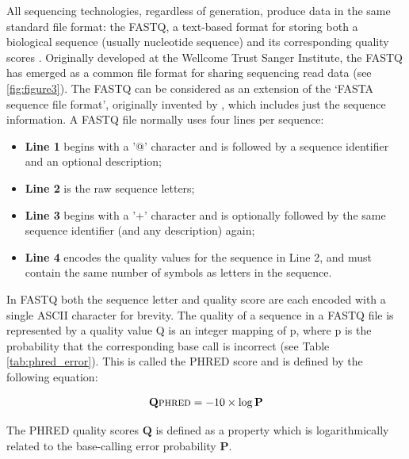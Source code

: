 All sequencing technologies, regardless of generation, produce data in the same standard file format: the FASTQ, a text-based format for storing both a biological sequence (usually nucleotide sequence) and its corresponding quality scores \citep{cock_sanger_2010}. Originally developed at the Wellcome Trust Sanger Institute, the FASTQ has emerged as a common file format for sharing sequencing read data (see \ref{fig:figure3}). The FASTQ can be considered as an extension of the ‘FASTA sequence file format’, originally invented by \cite{pearson_improved_1988}, which includes just the sequence information. A FASTQ file normally uses four lines per sequence:

\begin{itemize}
    \item \textbf{Line 1} begins with a '@' character and is followed by a sequence identifier and an optional description;
    \item \textbf{Line 2} is the raw sequence letters;
    \item \textbf{Line 3} begins with a '+' character and is optionally followed by the same sequence identifier (and any description) again;
    \item \textbf{Line 4} encodes the quality values for the sequence in Line 2, and must contain the same number of symbols as letters in the sequence.
\end{itemize}

In FASTQ both the sequence letter and quality score are each encoded with a single ASCII character for brevity. The quality of a sequence in a FASTQ file is represented by a quality value Q is an integer mapping of p, where p is the probability that the corresponding base call is incorrect (see Table \ref{tab:phred_error}). This is called the PHRED score \citep{ewing_base-calling_1998} and is defined by the following equation:

\begin{equation}
\centering
\mathbf{Q}\textsc{phred} = - 10 \times \log \mathbf{P}
\end{equation}
 
The PHRED quality scores $\mathbf{Q}$ is defined as a property which is logarithmically related to the base-calling error probability $\mathbf{P}$.

